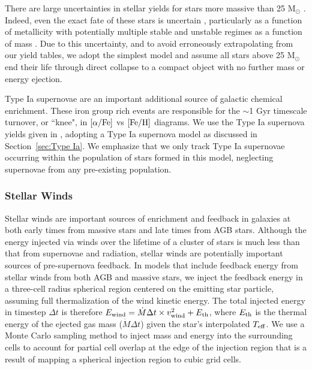 \documentclass[twocolumn]{aastex61}
\begin{document}
There are large uncertainties in stellar yields for stars more massive than 25 M$_{\odot}$ \citep[see ][and references therein]{Cote2016}. Indeed, even the exact fate of these stars is uncertain \citep[e.g.][]{Woosley2002,Zhang2008,Ugliano2012}, particularly as a function of metallicity \citep{Fryer2012} with potentially multiple stable and unstable regimes as a function of mass \citep{Heger2003}. Due to this uncertainty, and to avoid erroneously extrapolating from our yield tables, we adopt the simplest model and assume all stars above 25 M$_{\odot}$ end their life through direct collapse to a compact object with no further mass or energy ejection.

Type Ia supernovae are an important additional source of galactic chemical enrichment. These iron group rich events are responsible for the $\sim$1 Gyr timescale turnover, or ``knee", in $[\alpha/\rm{Fe}]$ vs $[\rm{Fe}/\rm{H}]$ diagrams. We use the Type Ia supernova yields given in \citet{Thielemann1986}, adopting a Type Ia supernova model as discussed in Section~\ref{sec:Type Ia}. We emphasize that we only track Type Ia supernovae occurring within the population of stars formed in this model, neglecting supernovae from any pre-existing population.

\subsubsection{Stellar Winds}
\label{sec:stellar winds}
Stellar winds are important sources of enrichment and feedback in galaxies at both early times from massive stars and late times from AGB stars. Although the energy injected via winds over the lifetime of a cluster of stars is much less than that from supernovae and radiation, stellar winds are potentially important sources of pre-supernova feedback. In models that include feedback energy from stellar winds from both AGB and  massive stars, we inject the feedback energy in a three-cell radius spherical region centered on the emitting star particle, assuming full thermalization of the wind kinetic energy. The total injected energy in timestep $\Delta t$ is therefore $E_{\rm wind} = \dot{M}\Delta t \times v^2_{\rm wind} + E_{\rm th}$, where $E_{\rm th}$ is the thermal energy of the ejected gas mass ($\dot{M}\Delta t$) given the star's interpolated $T_{\rm eff}$. We use a Monte Carlo sampling method to inject mass and energy into the surrounding cells to account for partial cell overlap at the edge of the injection region that is a result of mapping a spherical injection region to cubic grid cells.
\end{document}
